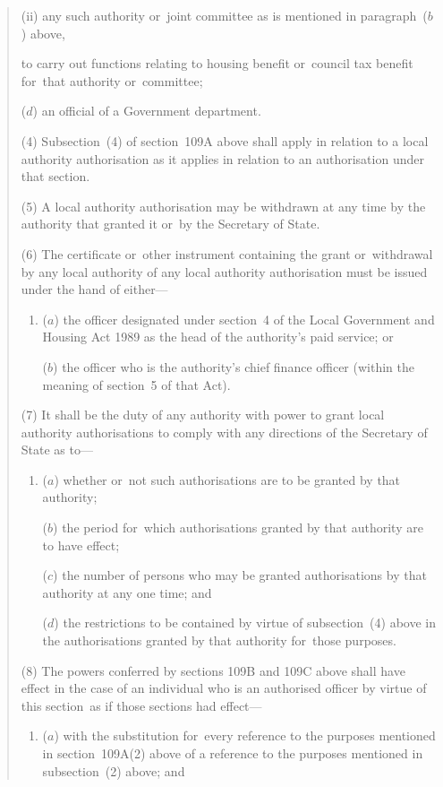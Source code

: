 \documentclass[12pt,a4paper]{article}
\begin{document}
\begin{quotation}
\begin{enumerate}
\begin{enumerate}
(ii) any such authority or~joint committee as is mentioned in paragraph~($b$)  above,
\end{enumerate}
to carry out functions relating to housing benefit or~council tax benefit for~that authority or~committee;

($d$) an official of a Government department.
\end{enumerate}

(4) Subsection~(4)  of section~109A above shall apply in relation to a local authority authorisation as it applies in relation to an authorisation under that section.

(5) A local authority authorisation may be withdrawn at any time by the authority that granted it or~by the Secretary of State.

(6) The certificate or~other instrument containing the grant or~withdrawal by any local authority of any local authority authorisation must be issued under the hand of either—
\begin{enumerate}\item[]
($a$) the officer designated under section~4 of the Local Government and Housing Act 1989 as the head of the authority’s paid service; or

($b$) the officer who is the authority’s chief finance officer (within the meaning of section~5 of that Act).
\end{enumerate}

(7) It shall be the duty of any authority with power to grant local authority authorisations to comply with any directions of the Secretary of State as to—
\begin{enumerate}\item[]
($a$) whether or~not such authorisations are to be granted by that authority;

($b$) the period for~which authorisations granted by that authority are to have effect;

($c$) the number of persons who may be granted authorisations by that authority at any one time; and

($d$) the restrictions to be contained by virtue of subsection~(4)  above in the authorisations granted by that authority for~those purposes.
\end{enumerate}

(8) The powers conferred by sections 109B and 109C above shall have effect in the case of an individual who is an authorised officer by virtue of this section~as if those sections had effect—
\begin{enumerate}\item[]
($a$) with the substitution for~every reference to the purposes mentioned in section~109A(2)  above of a reference to the purposes mentioned in subsection~(2)  above; and


\end{enumerate}
\end{quotation}
\end{document}
